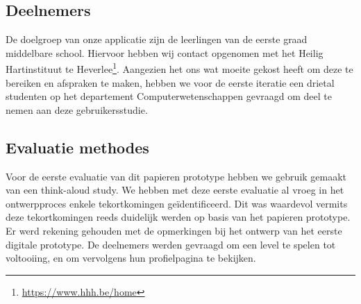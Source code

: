 \documentclass[11pt]{article}
\begin{document}
	\subsection{Deelnemers}
De doelgroep van onze applicatie zijn de leerlingen van de eerste graad middelbare school. Hiervoor hebben wij contact opgenomen met het Heilig Hartinstituut te Heverlee\footnote{\url{https://www.hhh.be/home}}. Aangezien het ons wat moeite gekost heeft om deze te bereiken en afspraken te maken, hebben we voor de eerste iteratie een drietal studenten op het departement Computerwetenschappen gevraagd om deel te nemen aan deze gebruikersstudie.
    
    \subsection{Evaluatie methodes}
Voor de eerste evaluatie van dit papieren prototype hebben we gebruik gemaakt van een think-aloud study. We hebben met deze eerste evaluatie al vroeg in het ontwerpproces enkele tekortkomingen geïdentificeerd. Dit was waardevol vermits deze tekortkomingen reeds duidelijk werden op basis van het papieren prototype. Er werd rekening gehouden met de opmerkingen bij het ontwerp van het eerste digitale prototype. De deelnemers werden gevraagd om een level te spelen tot voltooiing, en om vervolgens hun profielpagina te bekijken.
\end{document}
